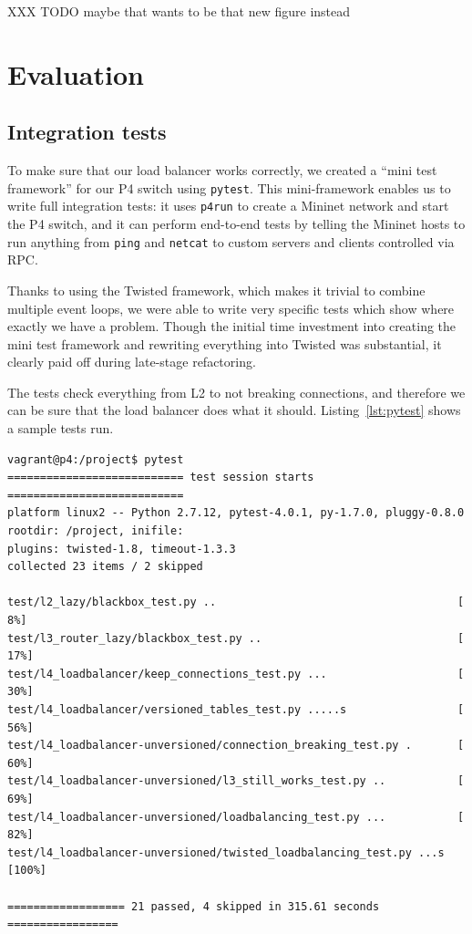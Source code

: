 \documentclass[11pt,oneside,a4paper]{article}
\begin{document}
XXX TODO maybe that wants to be that new figure instead

\section{Evaluation}
\subsection{Integration tests}

To make sure that our load balancer works correctly, we created a ``mini test
framework'' for our P4 switch using \texttt{pytest}\cite{pytest}.
This mini-framework enables us to write full integration tests: it uses
\texttt{p4run} to create a Mininet network and start the P4 switch, and it
can perform end-to-end tests by telling the Mininet hosts to run anything
from \texttt{ping} and \texttt{netcat} to custom servers and clients controlled
via RPC.

Thanks to using the Twisted framework, which makes it trivial to combine
multiple event loops, we were able to write very specific
tests which show where exactly we have a problem.
Though the initial time investment into creating the mini test framework and
rewriting everything into Twisted was substantial, it clearly paid off during
late-stage refactoring.

The tests check everything from L2 to not breaking connections, and therefore we
can be sure that the load balancer does what it should.
Listing~\ref{lst:pytest} shows a sample tests run.

\begin{lstlisting}[basicstyle=\ttfamily\small,caption=A sample test
                   session,captionpos=b,label=lst:pytest]
vagrant@p4:/project$ pytest                                          
=========================== test session starts ===========================
platform linux2 -- Python 2.7.12, pytest-4.0.1, py-1.7.0, pluggy-0.8.0
rootdir: /project, inifile:
plugins: twisted-1.8, timeout-1.3.3
collected 23 items / 2 skipped

test/l2_lazy/blackbox_test.py ..                                     [  8%]
test/l3_router_lazy/blackbox_test.py ..                              [ 17%]
test/l4_loadbalancer/keep_connections_test.py ...                    [ 30%]
test/l4_loadbalancer/versioned_tables_test.py .....s                 [ 56%]
test/l4_loadbalancer-unversioned/connection_breaking_test.py .       [ 60%]
test/l4_loadbalancer-unversioned/l3_still_works_test.py ..           [ 69%]
test/l4_loadbalancer-unversioned/loadbalancing_test.py ...           [ 82%]
test/l4_loadbalancer-unversioned/twisted_loadbalancing_test.py ...s  [100%]

================== 21 passed, 4 skipped in 315.61 seconds =================
\end{lstlisting}
\end{document}
